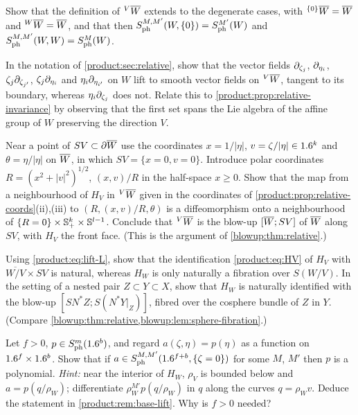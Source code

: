 \begin{exercise}\label{product:ex:degenerate}
Show that the definition of ${}^{V}\overline{W}$ extends to the degenerate cases, with
${}^{\{0\}}\overline{W}=\overline{W}$ and ${}^{W}\overline{W}=\overline{W}$, and that then
$S^{M,M'}_{\mathrm{ph}}(W,\{0\})=S^{M'}_{\mathrm{ph}}(W)$ and
$S^{M,M'}_{\mathrm{ph}}(W,W)=S^{M}_{\mathrm{ph}}(W)$.
\end{exercise}

\begin{exercise}\label{product:ex:vector-fields}
In the notation of \cref{product:sec:relative}, show that the vector fields
$\partial_{\zeta_j}$, $\partial_{\eta_i}$, $\zeta_j\partial_{\zeta_{j'}}$, $\zeta_j\partial_{\eta_i}$ and
$\eta_i\partial_{\eta_{i'}}$ on $W$ lift to smooth vector fields on ${}^{V}\overline{W}$, tangent to
its boundary, whereas $\eta_i\partial_{\zeta_j}$ does not. Relate this to
\cref{product:prop:relative-invariance} by observing that the first set spans the Lie
algebra of the affine group of $W$ preserving the direction $V$.
\end{exercise}

\begin{exercise}\label{product:ex:blow-up}
Near a point of $SV\subset\partial\overline{W}$ use the coordinates $x=1/|\eta|$,
$v=\zeta/|\eta|\in1.6^k$ and $\theta=\eta/|\eta|$ on $\overline{W}$, in which $SV=\{x=0,v=0\}$.
Introduce polar coordinates $R=(x^2+|v|^2)^{1/2}$, $(x,v)/R$ in the half-space
$x\ge0$. Show that the map from a neighbourhood of $H_V$ in ${}^{V}\overline{W}$ given in the
coordinates of \cref{product:prop:relative-coords}(ii),(iii) to
$(R,(x,v)/R,\theta)$ is a diffeomorphism onto a neighbourhood of
$\{R=0\}\times\mathbb{S}^k_+\times\mathbb{S}^{l-1}$. Conclude that ${}^{V}\overline{W}$ is the
blow-up $[\overline{W};SV]$ of $\overline{W}$ along $SV$, with $H_V$ the front face.
(This is the argument of \cref{blowup:thm:relative}.)
\end{exercise}

\begin{exercise}\label{product:ex:faces}
Using \eqref{product:eq:lift-L}, show that the identification \eqref{product:eq:HV}
of $H_V$ with $\overline{W/V}\times SV$ is natural, whereas $H_W$ is only naturally
a fibration over $S(W/V)$. In the setting of a nested pair $Z\subset Y\subset X$,
show that $H_W$ is naturally identified with the blow-up
$[SN^*Z;S(N^*Y|_Z)]$, fibred over the cosphere bundle of $Z$ in $Y$.
(Compare \cref{blowup:thm:relative,blowup:lem:sphere-fibration}.)
\end{exercise}

\begin{exercise}\label{product:ex:base-lift}
Let $f>0$, $p\in S^{m}_{\mathrm{ph}}(1.6^b)$, and regard $a(\zeta,\eta)=p(\eta)$ as a function on
$1.6^f\times1.6^b$. Show that if $a\in S^{M,M'}_{\mathrm{ph}}(1.6^{f+b},\{\zeta=0\})$ for
some $M$, $M'$ then $p$ is a polynomial. \emph{Hint:} near the interior of $H_W$,
$\rho_V$ is bounded below and $a=p(q/\rho_W)$; differentiate
$\rho_W^{M'}p(q/\rho_W)$ in $q$ along the curves $q=\rho_Wv$. Deduce the statement in
\cref{product:rem:base-lift}. Why is $f>0$ needed?
\end{exercise}

